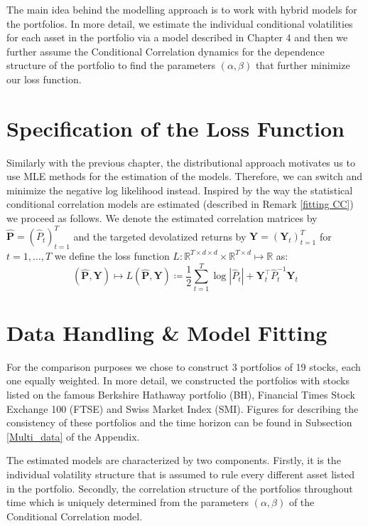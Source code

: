 \documentclass[a4paper, oneside]{discothesis}
\begin{document}
The main idea behind the modelling approach is to work with hybrid models for the portfolios. In more detail, we estimate the individual conditional volatilities for each asset in the portfolio via a model described in Chapter 4 and then we further assume the Conditional Correlation dynamics for the dependence structure of the portfolio to find the parameters $(\alpha, \beta)$ that further minimize our loss function.

\section{Specification of the Loss Function}
Similarly with the previous chapter, the distributional approach motivates us to use MLE methods for the estimation of the models. Therefore, we can switch and minimize the negative log likelihood instead. Inspired by the way the statistical conditional correlation models are estimated (described in Remark \ref{fitting CC}) we proceed as follows. We denote the estimated correlation matrices by $\mathbf{\widehat{P}} = \left(\widehat{P}_t\right)_{t=1}^T$ and the targeted devolatized returns by $\mathbf{Y} = \left(\mathbf{Y}_t\right)_{t=1}^T$ for $t = 1, \dots, T$ we define the loss function $L:\mathbb{R}^{T\times d\times d}\times \mathbb{R}^{T\times d}\mapsto \mathbb{R}$ as:
\begin{equation}\label{md_loss}
    \left(\mathbf{\widehat{P}}, \mathbf{Y}\right)\longmapsto L\left(\mathbf{\widehat{P}}, \mathbf{Y}\right) \coloneqq \frac{1}{2}\sum_{t=1}^T \log \left|\widehat{P}_t\right| + \mathbf{Y}_t^\intercal \widehat{P}_t^{-1} \mathbf{Y}_t
\end{equation}

\section{Data Handling \& Model Fitting}

For the comparison purposes we chose to construct 3 portfolios of 19 stocks, each one equally weighted. In more detail, we constructed the portfolios with stocks listed on the famous Berkshire Hathaway portfolio (BH), Financial Times Stock Exchange 100 (FTSE) and Swiss Market Index (SMI). Figures for describing the consistency of these portfolios and the time horizon can be found in Subsection \ref{Multi_data} of the Appendix.  

The estimated models are characterized by two components. Firstly, it is the individual volatility structure that is assumed to rule every different asset listed in the portfolio. Secondly, the correlation structure of the portfolios throughout time which is uniquely determined from the parameters $(\alpha, \beta)$ of the Conditional Correlation model.
\end{document}
